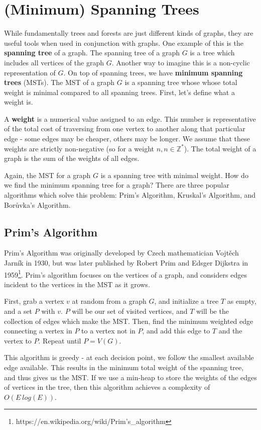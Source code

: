 \section{(Minimum) Spanning Trees}
While fundamentally trees and forests are just different kinds of graphs, they are useful tools when used in conjunction with graphs. One example of this is the \textbf{spanning tree} of a graph. The spanning tree of a graph $G$ is a tree which includes all vertices of the graph $G$. Another way to imagine this is a non-cyclic representation of $G$. On top of spanning trees, we have \textbf{minimum spanning trees} (MSTs). The MST of a graph $G$ is a spanning tree whose whose total weight is minimal compared to all spanning trees. First, let's define what a weight is.

A \textbf{weight} is a numerical value assigned to an edge. This number is representative of the total cost of traversing from one vertex to another along that particular edge - some edges may be cheaper, others may be longer. We assume that these weights are strictly non-negative (so for a weight $n, n \in \mathbb{Z}^*$). The total weight of a graph is the sum of the weights of all edges.

Again, the MST for a graph $G$ is a spanning tree with minimal weight. How do we find the minimum spanning tree for a graph? There are three popular algorithms which solve this problem: Prim's Algorithm, Kruskal's Algorithm, and Bor\r{u}vka's Algorithm.
\subsection{Prim's Algorithm}
Prim's Algorithm was originally developed by Czech mathematician Vojt\v{e}ch Jarn\'{i}k in 1930, but was later published by Robert Prim and Edsger Dijkstra in 1959\footnote{https://en.wikipedia.org/wiki/Prim's\_algorithm}. Prim's algorithm focuses on the vertices of a graph, and considers edges incident to the vertices in the MST as it grows. 

First, grab a vertex $v$ at random from a graph $G$, and initialize a tree $T$ as empty, and a set $P$ with $v$. $P$ will be our set of visited vertices, and $T$ will be the collection of edges which make the MST. Then, find the minimum weighted edge connecting a vertex in $P$ to a vertex not in $P$, and add this edge to $T$ and the vertex to $P$. Repeat until $P = V(G)$.

This algorithm is greedy - at each decision point, we follow the smallest available edge available. This results in the minimum total weight of the spanning tree, and thus gives us the MST. If we use a min-heap to store the weights of the edges of vertices in the tree, then this algorithm achieves a complexity of $O(E~log(E))$. 
